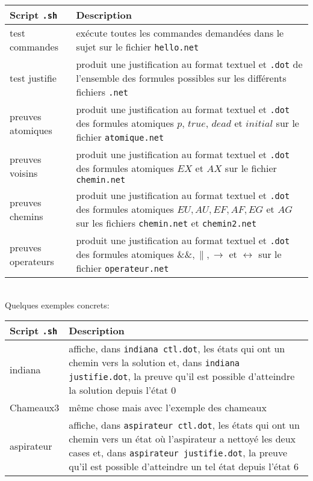 \documentclass[dvipsnames]{report}
\begin{document}
\noindent\begin{tabularx}{\linewidth}{| @{}l | X@{} |}
\hline
Script \texttt{.sh} & Description \\
\hline
test commandes & exécute toutes les commandes demandées dans le sujet sur le fichier \texttt{hello.net} \\
\hline
test justifie & produit une justification au format textuel et \texttt{.dot} de l'ensemble des formules possibles sur les différents fichiers \texttt{.net} \\
\hline
preuves atomiques & produit une justification au format textuel et \texttt{.dot} des formules atomiques $p$, $true$, $dead$ et $initial$ sur le fichier \texttt{atomique.net} \\
\hline
preuves voisins & produit une justification au format textuel et \texttt{.dot} des formules atomiques $EX$ et $AX$ sur le fichier \texttt{chemin.net} \\
\hline
preuves chemins & produit une justification au format textuel et \texttt{.dot} des formules atomiques $EU, AU, EF, AF, EG$ et $AG$ sur les fichiers \texttt{chemin.net} et \texttt{chemin2.net} \\
\hline
preuves operateurs & produit une justification au format textuel et \texttt{.dot} des formules atomiques $\&\&, \|, \rightarrow$ et $\leftrightarrow$ sur le fichier \texttt{operateur.net} \\
\hline
\end{tabularx}

~\\\indent Quelques exemples concrets:\\

\noindent\begin{tabularx}{\linewidth}{| @{}l | X@{} |}
\hline
Script \texttt{.sh} & Description \\
\hline
indiana & affiche, dans \texttt{indiana ctl.dot}, les états qui ont un chemin vers la solution et, dans \texttt{indiana justifie.dot}, la preuve qu'il est possible d'atteindre la solution depuis l'état 0 \\
\hline
Chameaux3 & même chose mais avec l'exemple des chameaux \\
\hline
aspirateur & affiche, dans \texttt{aspirateur ctl.dot}, les états qui ont un chemin vers un état où l'aspirateur a nettoyé les deux cases et, dans \texttt{aspirateur justifie.dot}, la preuve qu'il est possible d'atteindre un tel état depuis l'état 6 \\
\hline
\end{tabularx}
\end{document}

